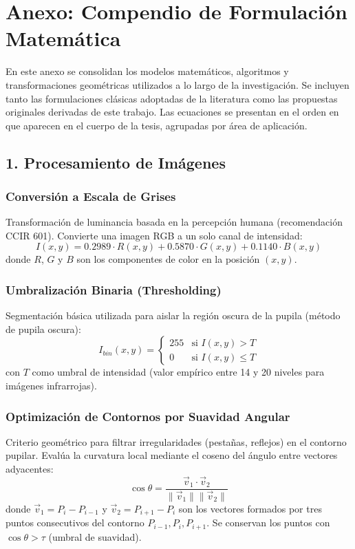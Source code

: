 \chapter*{Anexo: Compendio de Formulación Matemática}

En este anexo se consolidan los modelos matemáticos, algoritmos y transformaciones geométricas utilizados a lo largo de la investigación. Se incluyen tanto las formulaciones clásicas adoptadas de la literatura como las propuestas originales derivadas de este trabajo. Las ecuaciones se presentan en el orden en que aparecen en el cuerpo de la tesis, agrupadas por área de aplicación.

\section*{1. Procesamiento de Imágenes}

\subsection*{Conversión a Escala de Grises}
Transformación de luminancia basada en la percepción humana (recomendación CCIR 601). Convierte una imagen RGB a un solo canal de intensidad:
\begin{equation}
	I(x,y) = 0.2989 \cdot R(x,y) + 0.5870 \cdot G(x,y) + 0.1140 \cdot B(x,y)
	\label{eq:anexo_grises}
\end{equation}
donde $R$, $G$ y $B$ son los componentes de color en la posición $(x,y)$.

\subsection*{Umbralización Binaria (Thresholding)}
Segmentación básica utilizada para aislar la región oscura de la pupila (método de pupila oscura):
\begin{equation}
	I_{bin}(x, y) = \begin{cases} 
		255 & \text{si } I(x, y) > T \\
		0 & \text{si } I(x, y) \leq T 
	\end{cases}
	\label{eq:anexo_threshold}
\end{equation}
con $T$ como umbral de intensidad (valor empírico entre 14 y 20 niveles para imágenes infrarrojas).

\subsection*{Optimización de Contornos por Suavidad Angular}
Criterio geométrico para filtrar irregularidades (pestañas, reflejos) en el contorno pupilar. Evalúa la curvatura local mediante el coseno del ángulo entre vectores adyacentes:
\begin{equation}
	\cos \theta = \frac{\vec{v}_1 \cdot \vec{v}_2}{\|\vec{v}_1\| \|\vec{v}_2\|}
	\label{eq:anexo_contorno}
\end{equation}
donde $\vec{v}_1 = P_i - P_{i-1}$ y $\vec{v}_2 = P_{i+1} - P_i$ son los vectores formados por tres puntos consecutivos del contorno $P_{i-1}, P_i, P_{i+1}$. Se conservan los puntos con $\cos \theta > \tau$ (umbral de suavidad).

